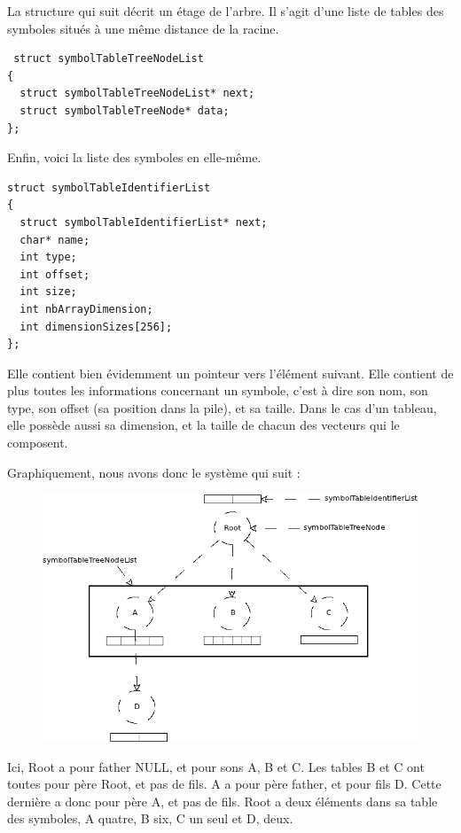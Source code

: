 La structure qui suit décrit un étage de l'arbre. Il s'agit d'une liste de tables des symboles situés à une même distance de la racine.

\begin{verbatim} 
 struct symbolTableTreeNodeList
{
  struct symbolTableTreeNodeList* next;
  struct symbolTableTreeNode* data;
};
\end{verbatim} 

Enfin, voici la liste des symboles en elle-même.

\begin{verbatim}
struct symbolTableIdentifierList
{
  struct symbolTableIdentifierList* next;
  char* name;
  int type;
  int offset;
  int size;
  int nbArrayDimension;
  int dimensionSizes[256];
};
\end{verbatim} 
 
Elle contient bien évidemment un pointeur vers l'élément suivant.
Elle contient de plus toutes les informations concernant un symbole, c'est à dire son nom, son type, son offset (sa position dans la pile), et sa taille.
Dans le cas d'un tableau, elle possède aussi sa dimension, et la taille de chacun des vecteurs qui le composent.

Graphiquement, nous avons donc le système qui suit : 

\begin{figure}[h!]
\includegraphics[scale=0.5]{arbresym}
\end{figure}

Ici, Root a pour father NULL, et pour sons A, B et C.
Les tables B et C ont toutes pour père Root, et pas de fils.
A a pour père father, et pour fils D. Cette dernière a donc pour père A, et pas de fils.
Root a deux éléments dans sa table des symboles, A quatre, B six, C un seul et D, deux.